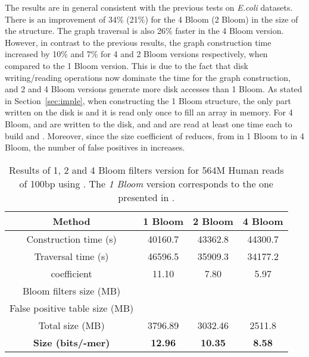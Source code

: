 \documentclass[pdftex]{llncs}\usepackage[T1]{fontenc}
\begin{document}
The results are in general consistent with the previous tests on
\emph{E.coli} datasets. There is an improvement of 34\% (21\%) for the
4 Bloom (2 Bloom) in the size of the structure. The graph traversal is
also 26\% faster in the 4 Bloom version. However, in contrast to the
previous results, the graph construction time {increased} by 10\% and
7\% for 4 and 2 Bloom versions respectively, when compared to the 1
Bloom version. This is due to the fact that disk writing/reading
operations now dominate the time for the graph construction, and 2 and
4 Bloom versions generate more disk accesses than 1 Bloom.  As stated
in Section~\ref{sec:imple}, when constructing the 1 Bloom structure,
the only part written on the disk is  and it is read only once to
fill an array in memory. For 4 Bloom,  and  are written to
the disk, and  and  are read at least one time each to build
 and . Moreover, since the size coefficient of 
reduces, from  in 1 Bloom to  in 4 Bloom, the
number of false positives in  increases.


\begin{table}[htbp]
\begin{center}
\begin{tabular}{|c|c|c|c|}
\hline
Method                          & 1 Bloom & 2 Bloom & 4 Bloom \\
\hline \hline
Construction time (s)           &  40160.7 & 43362.8 & 44300.7 \\
\hline
Traversal time (s)              &  46596.5 & 35909.3 & 34177.2 \\
\hline
 coefficient                      &  11.10 &  7.80    & 5.97 \\
\hline
\multirow{4}{*}{Bloom filters size (MB)}  &   &  &   \\
                                          &                  &   &  \\
                                          &                  &                 &   \\
                                          &                  &                 &  \\
\hline
False positive table size (MB)  &   &  &  \\
\hline
Total size (MB)                 &  3796.89 & 3032.46 & 2511.8 \\
\hline
\bf Size (bits/-mer)             & \bf 12.96 & \bf 10.35 & {\bf 8.58} \\
\hline
\end{tabular}
\end{center}
\caption{Results of 1, 2 and 4 Bloom filters version for 564M Human
  reads of 100bp using . The \emph{1 Bloom} version
  corresponds to the one presented in
  \cite{DBLP:conf/wabi/ChikhiR12}. }\label{tab:human}
\end{table}
\end{document}
